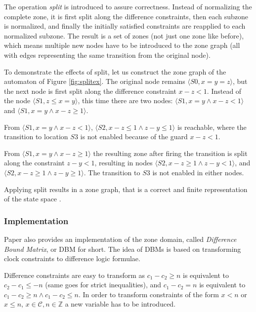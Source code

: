 The operation \emph{split} \cite{bengtsson2004timed} is introduced to assure correctness. Instead of
normalizing the complete zone, it is first split along the difference constraints,
then each subzone is normalized, and finally the initially satisfied constraints are reapplied to each normalized subzone. The result is a set of zones (not just one zone like before), which means multiple new nodes have to be introduced to the zone graph (all with edges representing the same transition from the original node).

\begin{example}
To demonstrate the effects of split, let us construct the zone graph of the automaton of Figure \ref{fig:splitex}. The original node remains  $\langle S0,x=y=z \rangle$, but the next node is first split along the difference constraint $x-z<1$. Instead of the node $\langle S1,z \leq x=y \rangle$, this time there are two nodes: $\langle S1, x=y \wedge x-z<1 \rangle$ and $\langle S1, x=y \wedge x-z \geq 1 \rangle$.

From  $\langle S1, x=y \wedge x-z<1 \rangle$,  $\langle S2,x-z \leq 1 \wedge z-y \leq 1\rangle$ is reachable, where the transition to location $S3$ is not enabled because of the guard $x-z < 1$.

From $\langle S1, x=y \wedge x-z \geq 1 \rangle$ the resulting zone after firing the transition is split along the constraint $z-y<1$, resulting in nodes $\langle S2, x-z \geq 1 \wedge z-y < 1\rangle$, and $\langle S2, x-z \geq 1 \wedge z-y \geq 1\rangle$. The transition to $S3$ is not enabled in either nodes. 
\end{example}

Applying split results in a zone graph, that is a correct and finite representation of the state space \cite{bengtsson2004timed}.

\subsubsection{Implementation}

Paper \cite{bengtsson2004timed} also provides an implementation of the zone domain, called \emph{Difference Bound Matrix}, or DBM for short. The idea of DBMs is based on transforming clock constraints to difference logic formulae.

Difference constraints are easy to transform as $c_1 - c_2 \geq n$ is equivalent to $c_2 - c_1 \leq -n$ (same goes for strict inequalities), and $c_1- c_2 = n$ is equivalent to $c_1 - c_2 \geq n \wedge c_1 - c_2 \leq n$. In order to transform constraints of the form $x<n$ or $x \leq n$, $x \in \mathcal{C}, n \in \mathds{Z}$ a new variable has to be introduced. 

